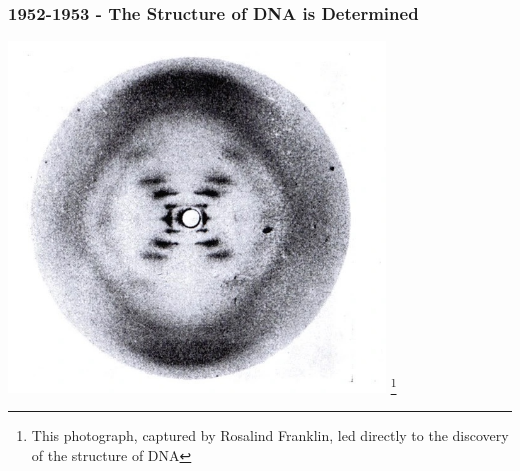 \documentclass{beamer}
\newcommand\blfootnote[1]{%
	\begingroup
	\renewcommand\thefootnote{}\footnote{#1}%
	\addtocounter{footnote}{-1}%
	\endgroup
}
\begin{document}
		
		\begin{frame}
			\frametitle{1952-1953 - The Structure of DNA is Determined}
			\centering
			\includegraphics[keepaspectratio, width  =0.75\textwidth]{img/photo_51}  \blfootnote{This photograph, captured by Rosalind Franklin, led directly to the discovery of the structure of DNA}
			
		\end{frame}
	
	
	
\end{document}
